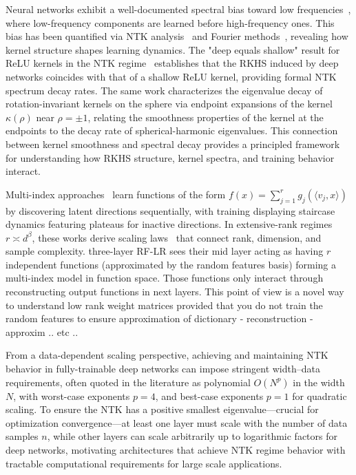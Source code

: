 Neural networks exhibit a well-documented spectral bias toward low frequencies~\cite{rahaman2019spectral,xu2019training}, where low-frequency components are learned
 before high-frequency ones. This bias has been quantified via NTK analysis~\cite{basri2020frequency} and Fourier methods~\cite{tancik2020fourier}, revealing how kernel 
 structure shapes learning dynamics. The "deep equals shallow" result for ReLU kernels in the NTK regime~\cite{bietti2021deepequalsshallowrelu} establishes that the RKHS
  induced by deep networks coincides with that of a shallow ReLU kernel, providing formal NTK spectrum decay rates. The same work characterizes the eigenvalue decay of 
  rotation-invariant kernels on the sphere via endpoint expansions of the kernel \( \kappa(\rho) \) near \( \rho=\pm 1 \), relating the smoothness properties of the kernel at the endpoints to the decay rate of spherical-harmonic eigenvalues. This connection between kernel smoothness and spectral decay provides a principled framework for understanding how RKHS structure, kernel spectra, and training behavior interact.

Multi-index approaches~\cite{benarous2021online,damian2022neural,abbe2023sgd} learn functions of the form \( f(x)=\sum_{j=1}^r g_j(\langle v_j,x\rangle) \) by 
discovering latent directions sequentially, with training displaying staircase dynamics featuring plateaus for inactive directions. In extensive-rank regimes 
\( r\asymp d^\beta \), these works derive scaling laws~\cite{damian2022neural} that connect rank, dimension, and sample complexity. three-layer RF-LR sees their mid layer
acting as having \(r\) independent functions (approximated by the random features basis) forming a multi-index model in function space. Those functions only 
interact through reconstructing output functions in next layers. This point of view is a novel way to understand low rank weight matrices provided
that you do not train the random features to ensure approximation of dictionary - reconstruction - approxim .. etc ..

From a data-dependent scaling perspective, achieving and maintaining NTK behavior in fully-trainable deep networks can impose stringent width–data 
requirements, often quoted in the literature as polynomial \( O(N^p) \) in the width \( N \), with worst-case exponents \( p = 4\), and best-case exponents \( p = 1\) \cite{nguyen2022tightboundssmallesteigenvalue}
for quadratic scaling. To ensure the NTK has a positive smallest eigenvalue—crucial for optimization 
 convergence—at least one layer must scale with the number of data samples \( n \), while other layers can scale arbitrarily up to logarithmic
 factors for deep networks, motivating architectures that achieve NTK regime behavior with tractable computational requirements for large scale applications.



